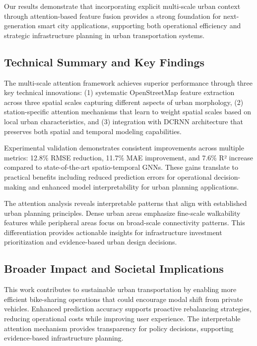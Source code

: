 \documentclass[sigconf,review,nonacm]{acmart}
\begin{document}
Our results demonstrate that incorporating explicit multi-scale urban context through attention-based feature fusion provides a strong foundation for next-generation smart city applications, supporting both operational efficiency and strategic infrastructure planning in urban transportation systems.

\subsection{Technical Summary and Key Findings}

The multi-scale attention framework achieves superior performance through three key technical innovations: (1) systematic OpenStreetMap feature extraction across three spatial scales capturing different aspects of urban morphology, (2) station-specific attention mechanisms that learn to weight spatial scales based on local urban characteristics, and (3) integration with DCRNN architecture that preserves both spatial and temporal modeling capabilities.

Experimental validation demonstrates consistent improvements across multiple metrics: 12.8\% RMSE reduction, 11.7\% MAE improvement, and 7.6\% R² increase compared to state-of-the-art spatio-temporal GNNs. These gains translate to practical benefits including reduced prediction errors for operational decision-making and enhanced model interpretability for urban planning applications.

The attention analysis reveals interpretable patterns that align with established urban planning principles. Dense urban areas emphasize fine-scale walkability features while peripheral areas focus on broad-scale connectivity patterns. This differentiation provides actionable insights for infrastructure investment prioritization and evidence-based urban design decisions.

\subsection{Broader Impact and Societal Implications}

This work contributes to sustainable urban transportation by enabling more efficient bike-sharing operations that could encourage modal shift from private vehicles. Enhanced prediction accuracy supports proactive rebalancing strategies, reducing operational costs while improving user experience. The interpretable attention mechanism provides transparency for policy decisions, supporting evidence-based infrastructure planning.
\end{document}
